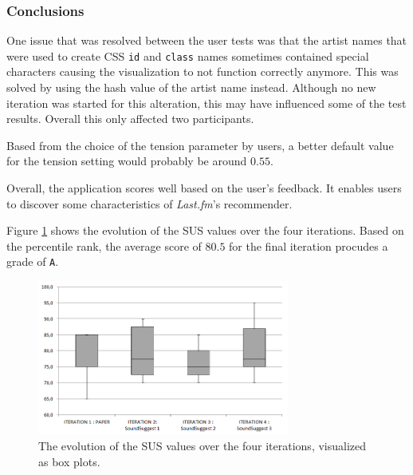

\subsubsection{Conclusions}\label{chapter:prototype:section:soundsuggest3:conclusion}

One issue that was resolved between the user tests was that the artist names that were used to create CSS \texttt{id} and \texttt{class} names sometimes contained special characters causing the visualization to not function correctly anymore. This was solved by using the hash value of the artist name instead. Although no new iteration was started for this alteration, this may have influenced some of the test results. Overall this only affected two participants.

Based from the choice of the tension parameter by users, a better default value for the tension setting would probably be around $0.55$.



Overall, the application scores well based on the user's feedback. It enables users to discover some characteristics of \emph{Last.fm}'s recommender.

Figure \ref{fig:iterations_sus_scores_boxplots} shows the evolution of the SUS values over the four iterations. Based on the percentile rank, the average score of $80.5$ for the final iteration procudes a grade of \texttt{A}.

\begin{figure}
	\includegraphics[width=8.3cm]{img/iterations_sus_scores_boxplots}
	\caption{The evolution of the SUS values over the four iterations, visualized as box plots.}
	\label{fig:iterations_sus_scores_boxplots}
\end{figure}



